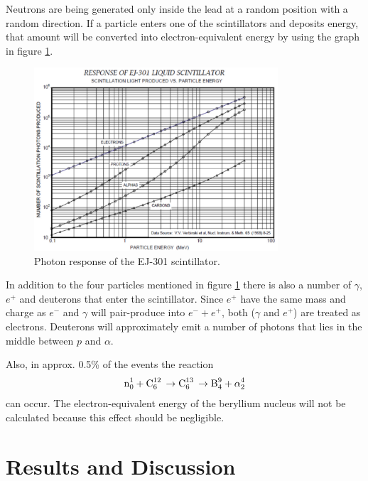 \documentclass[12pt]{article}
\begin{document}
Neutrons are being generated only inside the lead at a random position with a random direction.
If a particle enters one of the scintillators and deposits energy, that amount will be converted into electron-equivalent energy by using the graph in figure \ref{fig:photonResponse}.
\begin{figure}[htbp]
	\centering
	\includegraphics[width=0.81\textwidth]{./pics/scintillatorResponse.pdf}
	\caption{Photon response of the EJ-301 scintillator.}
	\label{fig:photonResponse}
\end{figure}
In addition to the four particles mentioned in figure \ref{fig:photonResponse} there is also a number of $\gamma$, $e^+$ and deuterons that enter the scintillator. Since $e^+$ have the same mass and charge as $e^-$ and $\gamma$ will pair-produce into $e^- + e^+$, both ($\gamma$ and $e^+$) are treated as electrons. Deuterons will approximately emit a number of photons that lies in the middle between $p$ and $\alpha$. 

Also, in approx. 0.5\% of the events the reaction 
\begin{align}
	\ce{n^1_0 + C^{12}_6 \rightarrow C^{13}_6 \rightarrow B^9_4 + \alpha^4_2 } 
\end{align}
can occur. The electron-equivalent energy of the beryllium nucleus will not be calculated because this effect should be negligible.

\section{Results and Discussion}
%
%
%
\end{document}
